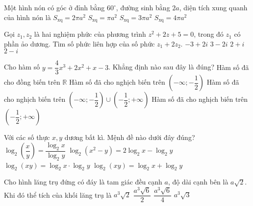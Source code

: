 \begin{ex}%
Một hình nón có góc ở đỉnh bằng $60^{\circ}$, đường sinh bằng $2a$, diện tích xung quanh của hình nón là
\choice
{\True $S_{\text{xq}} = 2\pi a^2$}
{$S_{\text{xq}} = \pi a^2$}
{$S_{\text{xq}} = 3\pi a^2$}
{$S_{\text{xq}} = 4\pi a^2$}
\end{ex}
\begin{ex}%
Gọi $z_1, z_2$ là hai nghiệm phức của phương trình $z^2 + 2z + 5 = 0$, trong đó $z_1$ có phần ảo dương. Tìm số phức liên hợp của số phức $z_1 + 2z_2$.
\choice
{\True $- 3 + 2i$}
{$3 - 2i$}
{$2 + i$}
{$2 - i$}
\end{ex}
\begin{ex}%
Cho hàm số $y = \dfrac{4}{3}x^3 + 2x^2 + x - 3$. Khẳng định nào sau đây là đúng?
\choice
{\True Hàm số đã cho đồng biến trên $\mathbb{R}$}
{Hàm số đã cho nghịch biến trên $\left(-\infty; - \dfrac{1}{2}\right)$}
{Hàm số đã cho nghịch biến trên $\left(-\infty; - \dfrac{1}{2}\right) \cup \left(- \dfrac{1}{2};+ \infty\right)$}
{Hàm số đã cho nghịch biến trên $\left(- \dfrac{1}{2};+ \infty\right)$}
\end{ex}
\begin{ex}%
Với các số thực $x, y$ dương bất kì. Mệnh đề nào dưới đây đúng?
\choice
{$\log_2 \left(\dfrac{x}{y}\right) = \dfrac{\log_2 x}{\log_2 y}$}
{$\log_2 \left(x^2 - y\right) = 2\log_2 x - \log_2 y$}
{$\log_2 \left(xy\right) = \log_2 x\cdot\log_2 y$}
{\True $\log_2 \left(xy\right) = \log_2 x + \log_2 y$}
\end{ex}
\begin{ex}%
Cho hình lăng trụ đứng có đáy là tam giác đều cạnh $a$, độ dài cạnh bên là $a\sqrt{2}$. Khi đó thể tích của khối lăng trụ là
\choice
{$a^3\sqrt{2}$}
{$\dfrac{a^3\sqrt{6}}{2}$}
{\True $\dfrac{a^3\sqrt{6}}{4}$}
{$a^3\sqrt{3}$}
\end{ex}
